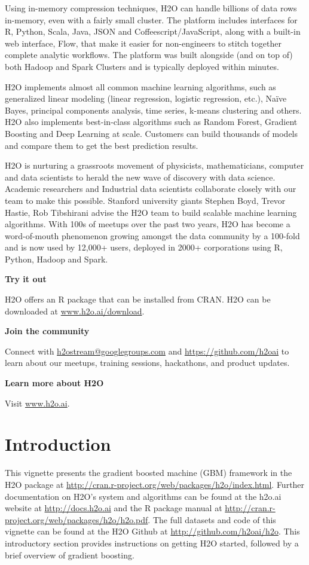 \documentclass{article}[11pt]
\begin{document}
Using in-memory compression techniques, H2O can handle billions of data rows in-memory, even with a fairly small cluster. The platform includes interfaces for R, Python, Scala, Java, JSON and Coffeescript/JavaScript, along with a built-in  web interface, Flow, that make it easier for non-engineers to stitch together complete analytic workflows. The platform was built alongside (and on top of) both Hadoop and Spark Clusters and is typically deployed within minutes.

H2O implements almost all common machine learning algorithms, such as generalized linear modeling (linear regression, logistic regression, etc.), Na\"{i}ve Bayes, principal components analysis, time series, k-means clustering and others. H2O also implements best-in-class algorithms such as Random Forest, Gradient Boosting and Deep Learning at scale. Customers can build thousands of models and compare them to get the best prediction results.

H2O is nurturing a grassroots movement of physicists, mathematicians, computer and data scientists to herald the new wave of discovery with data science. Academic researchers and Industrial data scientists collaborate closely with our team to make this possible. Stanford university giants Stephen Boyd, Trevor Hastie, Rob Tibshirani advise the H2O team to build scalable machine learning algorithms. With 100s of meetups over the past two years, H2O has become a word-of-mouth phenomenon growing amongst the data community by a 100-fold and is now used by 12,000+ users, deployed in 2000+ corporations using R, Python, Hadoop and Spark.

\textbf{Try it out}

H2O offers an R package that can be installed from CRAN. H2O can be downloaded at {\url{www.h2o.ai/download}}.

\textbf{Join the community}

Connect with {\url{h2ostream@googlegroups.com}} and {\url{https://github.com/h2oai}} to learn about our meetups, training sessions, hackathons, and product updates.

\textbf{Learn more about H2O}

Visit {\url{www.h2o.ai}}.

\section{Introduction}

This vignette presents the gradient boosted machine (GBM) framework in the H2O package at {\url{http://cran.r-project.org/web/packages/h2o/index.html}}. Further documentation on H2O's system and algorithms can be found at the h2o.ai website at {\url{http://docs.h2o.ai}} and the R package manual at {\url{http://cran.r-project.org/web/packages/h2o/h2o.pdf}}. The full datasets and code of this vignette can be found at the H2O Github at {\url{http://github.com/h2oai/h2o}}. This introductory section provides instructions on getting H2O started, followed by a brief overview of gradient boosting.
\end{document}
